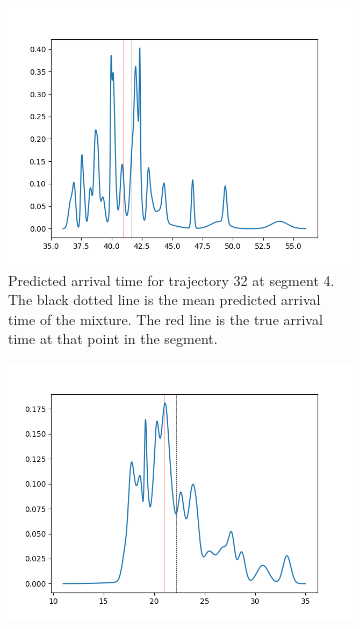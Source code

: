 \begin{figure}
    \centering
    \begin{subfigure}[b]{0.475\textwidth}
        \centering
        \includegraphics[width=\textwidth]{figures/arrival_times/res_5_traj32_seg4}
        \caption[]%
        {{\small Predicted arrival time for trajectory 32 at segment 4.
        The black dotted line is the mean predicted arrival time of the mixture.
        The red line is the true arrival time at that point in the segment.}}    
        \label{fig:result-1}
    \end{subfigure}
    \hfill
    \begin{subfigure}[b]{0.475\textwidth}  
        \centering 
        \includegraphics[width=\textwidth]{figures/arrival_times/res_10_traj13_seg10}

\end{subfigure}
\end{figure}
